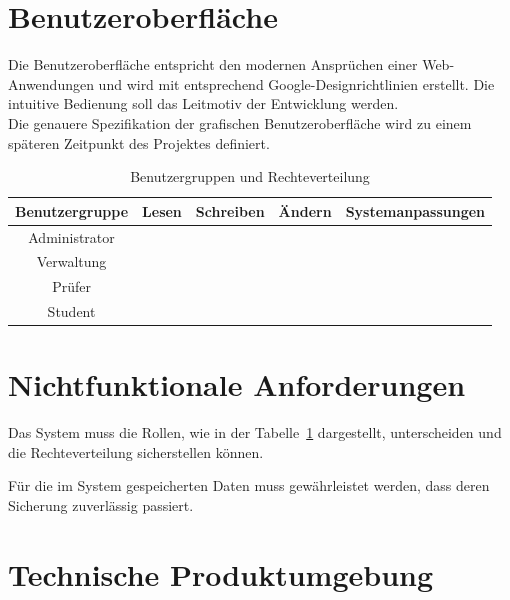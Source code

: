 	
	\section{Benutzeroberfläche}
	
	Die Benutzeroberfläche entspricht den modernen Ansprüchen einer Web-Anwendungen und wird mit entsprechend Google-Designrichtlinien erstellt. Die intuitive Bedienung soll das Leitmotiv der Entwicklung werden.\\
	
	Die genauere Spezifikation der grafischen Benutzeroberfläche wird zu einem späteren Zeitpunkt des Projektes definiert. 
	
	\begin{table}[ht]
	\caption{Benutzergruppen und Rechteverteilung}
	\begin{tabular}{|c|c|c|c|c|}
	\hline Benutzergruppe & Lesen & Schreiben & Ändern & Systemanpassungen \\ 
	\hline Administrator & \checkmark & \checkmark & \checkmark & \checkmark \\ 
	\hline Verwaltung & \checkmark & \checkmark & \checkmark &  \\ 
	\hline Prüfer & \checkmark & \checkmark &  &  \\ 
	\hline Student & \checkmark &  &  &  \\ 
	\hline 
	\end{tabular} 
	\label{tab:usergroup}
	\end{table}
	
	
	\section{Nichtfunktionale Anforderungen}
	
	\begin{description}
	\item[/Q10/] Das System muss die Rollen, wie in der Tabelle~\ref{tab:usergroup} dargestellt, unterscheiden und die Rechteverteilung sicherstellen können.
	\item[/Q20/] Für die im System gespeicherten Daten muss gewährleistet werden, dass deren Sicherung zuverlässig passiert.
	\end{description} 

	
	
	
	\section{Technische Produktumgebung}
	
